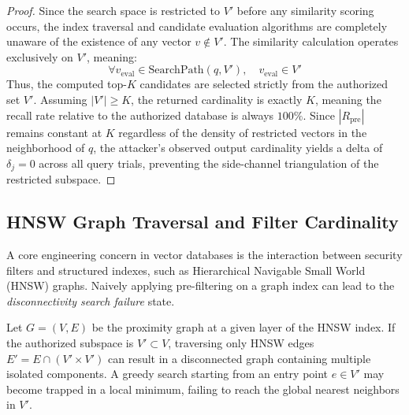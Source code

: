 \documentclass[sigconf]{acmart}
\begin{document}
\begin{proof}
Since the search space is restricted to $V'$ before any similarity scoring occurs, the index traversal and candidate evaluation algorithms are completely unaware of the existence of any vector $v \notin V'$. The similarity calculation operates exclusively on $V'$, meaning:
\begin{equation}
    \forall v_{\text{eval}} \in \text{SearchPath}(q, V'), \quad v_{\text{eval}} \in V'
\end{equation}
Thus, the computed top-$K$ candidates are selected strictly from the authorized set $V'$. Assuming $|V'| \ge K$, the returned cardinality is exactly $K$, meaning the recall rate relative to the authorized database is always $100\%$. Since $|R_{\text{pre}}|$ remains constant at $K$ regardless of the density of restricted vectors in the neighborhood of $q$, the attacker's observed output cardinality yields a delta of $\delta_j = 0$ across all query trials, preventing the side-channel triangulation of the restricted subspace.
\end{proof}

\subsection{HNSW Graph Traversal and Filter Cardinality}
A core engineering concern in vector databases is the interaction between security filters and structured indexes, such as Hierarchical Navigable Small World (HNSW) graphs. Naively applying pre-filtering on a graph index can lead to the \textit{disconnectivity search failure} state.

Let $G = (V, E)$ be the proximity graph at a given layer of the HNSW index. If the authorized subspace is $V' \subset V$, traversing only HNSW edges $E' = E \cap (V' \times V')$ can result in a disconnected graph containing multiple isolated components. A greedy search starting from an entry point $e \in V'$ may become trapped in a local minimum, failing to reach the global nearest neighbors in $V'$.
\end{document}
